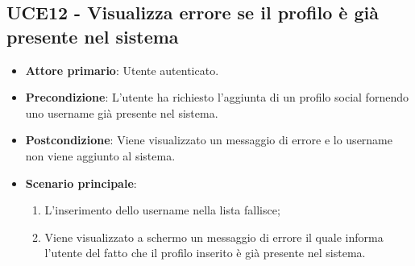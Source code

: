 \subsection{UCE12 - Visualizza errore se il profilo è già presente nel sistema}
\begin{itemize}
    \item \textbf{Attore primario}: Utente autenticato.
    \item \textbf{Precondizione}: L’utente ha richiesto l’aggiunta di un profilo social fornendo uno username già presente nel sistema.
    \item \textbf{Postcondizione}: Viene visualizzato un messaggio di errore e lo username non viene aggiunto al sistema.
    \item \textbf{Scenario principale}: 
    \begin{enumerate}
        \item L'inserimento dello username nella lista fallisce;
        \item Viene visualizzato a schermo un messaggio di errore il quale informa l'utente del fatto che il profilo inserito è già presente nel sistema.
    \end{enumerate}
\end{itemize}

